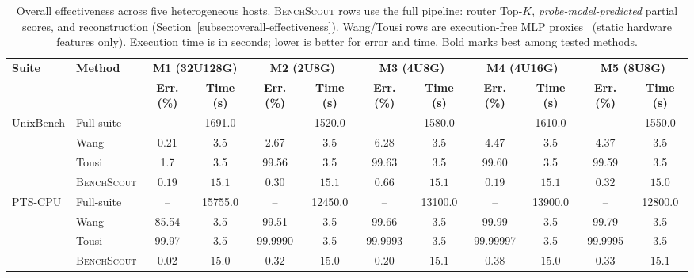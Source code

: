 \documentclass[sigplan,10pt]{acmart}
\newcommand{\ourmethod}{\textsc{BenchScout}\xspace}
\newcommand{\ptscpu}{PTS-CPU}
\begin{document}
\begin{table}[t]
\centering
\caption{Overall effectiveness across five heterogeneous hosts.
\ourmethod{} rows use the full pipeline: router Top-$K$, \emph{probe-model-predicted} partial scores, and reconstruction (Section~\ref{subsec:overall-effectiveness}).
Wang/Tousi rows are execution-free MLP proxies~\cite{wang2019predicting,tousi2022comparative} (static hardware features only).
Execution time is in seconds; lower is better for error and time. Bold marks best among tested methods.}
\label{tab:overall-effectiveness-expanded}
\footnotesize
\setlength{\tabcolsep}{4.5pt}
\begin{tabular}{llcccccccccc}
\toprule
\multirow{2}{*}{\textbf{Suite}} & \multirow{2}{*}{\textbf{Method}} & \multicolumn{2}{c}{\textbf{M1 (32U128G)}} & \multicolumn{2}{c}{\textbf{M2 (2U8G)}} & \multicolumn{2}{c}{\textbf{M3 (4U8G)}} & \multicolumn{2}{c}{\textbf{M4 (4U16G)}} & \multicolumn{2}{c}{\textbf{M5 (8U8G)}} \\
\cmidrule(lr){3-4} \cmidrule(lr){5-6} \cmidrule(lr){7-8} \cmidrule(lr){9-10} \cmidrule(lr){11-12}
& & \textbf{Err. (\%)} & \textbf{Time (s)} & \textbf{Err. (\%)} & \textbf{Time (s)} & \textbf{Err. (\%)} & \textbf{Time (s)} & \textbf{Err. (\%)} & \textbf{Time (s)} & \textbf{Err. (\%)} & \textbf{Time (s)} \\
\midrule

\multirow{4}{*}{UnixBench} 
& Full-suite & -- & 1691.0 & -- & 1520.0 & -- & 1580.0 & -- & 1610.0 & -- & 1550.0 \\
& Wang~\cite{wang2019predicting} & 0.21 & 3.5 & 2.67 & 3.5 & 6.28 & 3.5 & 4.47 & 3.5 & 4.37 & 3.5 \\
& Tousi~\cite{tousi2022comparative} & 1.7 & 3.5 & 99.56 & 3.5 & 99.63 & 3.5 & 99.60 & 3.5 & 99.59 & 3.5 \\
& \ourmethod & $\mathbf{0.19}$ & $\mathbf{15.1}$ & $\mathbf{0.30}$ & $\mathbf{15.1}$ & $\mathbf{0.66}$ & $\mathbf{15.1}$ & $\mathbf{0.19}$ & $\mathbf{15.1}$ & $\mathbf{0.32}$ & $\mathbf{15.0}$ \\

\midrule

\multirow{4}{*}{\ptscpu} 
& Full-suite & -- & 15755.0 & -- & 12450.0 & -- & 13100.0 & -- & 13900.0 & -- & 12800.0 \\
& Wang~\cite{wang2019predicting} & 85.54 & 3.5 & 99.51 & 3.5 & 99.66 & 3.5 & 99.99 & 3.5 & 99.79 & 3.5 \\
& Tousi~\cite{tousi2022comparative} & 99.97 & 3.5 & 99.9990 & 3.5 & 99.9993 & 3.5 & 99.99997 & 3.5 & 99.9995 & 3.5 \\
& \ourmethod & $\mathbf{0.02}$ & $\mathbf{15.0}$ & $\mathbf{0.32}$ & $\mathbf{15.0}$ & $\mathbf{0.20}$ & $\mathbf{15.1}$ & $\mathbf{0.38}$ & $\mathbf{15.0}$ & $\mathbf{0.33}$ & $\mathbf{15.1}$ \\


\end{tabular}
\end{table}
\end{document}
